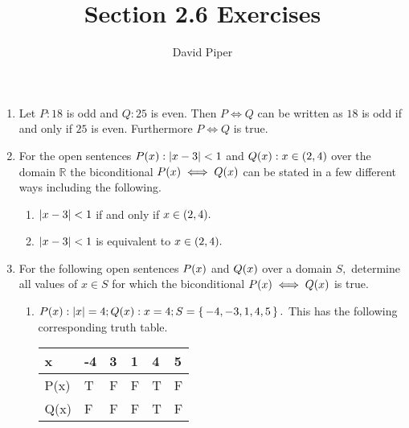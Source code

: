 \documentclass[12pt]{article}
\title{Section 2.6 Exercises}
\author{David Piper}
\makeatletter
\newcommand*{\arabicodd}[1]{%
  \expandafter\@arabicodd\csname c@#1\endcsname
}
\newcommand*{\@arabicodd}[1]{%
  \@arabic{\numexpr(#1)*2-1\relax}%
}
\makeatother
\begin{document}
\maketitle

\begin{enumerate}[label=2.\arabicodd*, start=18]
  \item Let $P: 18$ is odd and $Q: 25$ is even. Then $P \iff Q$ can be written
        as $18$ is odd if and only if $25$ is even. Furthermore  $P \iff Q$ is true.
  \item For the open sentences $P\qty(x): \abs{x-3} < 1$ and $Q\qty(x): x \in \qty(2,4)$
        over the domain $\mathbb{R}$ the biconditional $P\qty(x) \iff Q\qty(x)$ can be
        stated in a few different ways including the following.
        \begin{enumerate}[label=\arabic*.]
          \item $\abs{x-3}<1$ if and only if $x \in \qty(2,4).$
          \item $\abs{x-3}<1$ is equivalent to $x \in \qty(2,4).$
        \end{enumerate}
  \item For the following open sentences $P\qty(x)$ and $Q\qty(x)$ over a domain
        $S,$ determine all values of $x \in S$ for which the biconditional
        $P\qty(x) \iff Q\qty(x)$ is true.
        \begin{enumerate}[label=(\alph*)]
          \item $P\qty(x): \abs{x}=4; Q\qty(x): x=4; S=\set{-4,-3,1,4,5}.$
                This has the following corresponding truth table.
                \hfill
                \hfill
                \linebreak
                \linebreak
                \begin{minipage}{0.4\linewidth}
                  \begin{tabular}{@{}llllll@{}}
                    \toprule
                    x    & -4 & 3 & 1 & 4 & 5 \\ \midrule
                    P(x) & T  & F & F & T & F \\
                    Q(x) & F  & F & F & T & F \\ \bottomrule
                  \end{tabular}
                \end{minipage}
                \linebreak
                \linebreak

\end{enumerate}
\end{enumerate}
\end{document}
